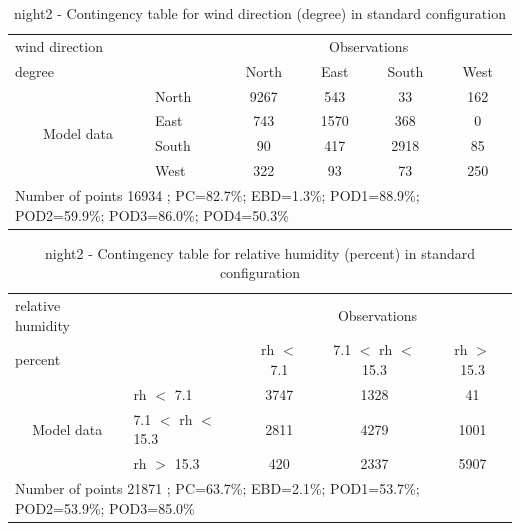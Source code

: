 \begin{table}[p!]
\begin{center}
\begin{tabular}{llcccc}
\hline
{wind direction}                                       &                             &    \multicolumn{4}{c}{Observations}                 \\
{degree}                                       &                             & {North}   & {East} & {South} & {West} \\
\hline
\multicolumn{1}{c}{\multirow{4}{*}{Model data}}  & {North}                    & 9267   & 543    & 33     & 162\\
                                                 & {East}                     & 743   & 1570    & 368     & 0\\
                                                 & {South}                    & 90   & 417   & 2918    & 85\\
                                                 & {West}                     & 322  & 93   & 73    & 250\\
\hline 
\multicolumn{6}{l}{ Number of points        16934 ; PC=82.7\%; EBD=1.3\%; POD1=88.9\%; POD2=59.9\%; POD3=86.0\%; POD4=50.3\%}                 \\
\end{tabular}
\end{center}
\caption{night2 - Contingency table for {wind direction} (degree) in standard configuration}
\label{tab:contingencywdBEF:night2}
\end{table}
\begin{table}[p!]
\begin{center}
\begin{tabular}{llccc}
\hline
{relative humidity}                                       &                                                    & \multicolumn{3}{c}{Observations}                 \\
{percent}                                       &                             & rh $<$ 7.1   & 7.1 $<$ rh $<$ 15.3 & rh $>$ 15.3 \\
\hline
\multicolumn{1}{c}{\multirow{3}{*}{Model data}}  & rh $<$ 7.1             & 3747                & 1328                       & 41              \\
                                                 & 7.1  $<$ rh $<$ 15.3 & 2811                & 4279                       & 1001              \\
                                                 & rh $>$ 15.3             & 420                & 2337                       & 5907              \\
\hline
\multicolumn{5}{l}{ Number of points        21871 ; PC=63.7\%; EBD=2.1\%; POD1=53.7\%; POD2=53.9\%; POD3=85.0\%}
\end{tabular}
\end{center}
\caption{night2 - Contingency table for  relative humidity (percent) in standard configuration}
\label{tab:contingencyrhBEF:night2}
\end{table}

